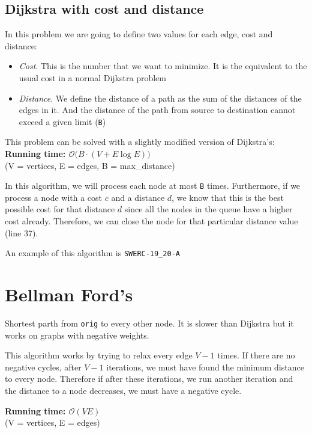 \documentclass[12pt]{report}
\begin{document}
\subsection{Dijkstra with cost and distance}
\label{graph:dijkstra:distances}
In this problem we are going to define two values for each edge, cost and distance:
\begin{itemize}
	\setlength\itemsep{0 pt}
	\item \textit{Cost}. This is the number that we want to minimize. It is the 
		equivalent to the usual cost in a normal Dijkstra problem
	\item \textit{Distance}. We define the distance of a path as the sum of the
		distances of the edges in it. And the distance of the path from source
		to destination cannot exceed a given limit (\texttt{B})
\end{itemize}
This problem can be solved with a slightly modified version of Dijkstra's:
\noindent \textbf{\boldmath Running time: $\mathcal{O}\big(B\cdot(V+E\log E)\big)$}
\\ {\small(V = vertices, E = edges, B = max\_distance)}

In this algorithm, we will process each node at most \texttt{B} times. Furthermore, 
if we process a node with a cost $c$ and a distance $d$, we know that this is the 
best possible cost for that distance $d$ since all the nodes in the queue have a higher
cost already. Therefore, we can close the node for that particular distance value (line 37).

An example of this algorithm is \texttt{SWERC-19\_20-A}


\section{Bellman Ford's}
Shortest parth from \texttt{orig} to every other node. It is slower than Dijkstra but 
it works on graphs with negative weights. 

This algorithm works by trying to relax every edge $V-1$ times. If there are no 
negative cycles, after $V-1$ iterations, we must have found the minimum distance
to every node. Therefore if after these iterations, we run another
iteration and the distance to a node decreases, we must have a negative cycle.

\noindent \textbf{\boldmath Running time: $\mathcal{O}(VE)$}
\\ {\small(V = vertices, E = edges)}
\end{document}
